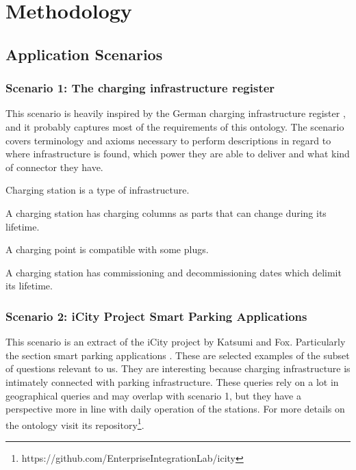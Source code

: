﻿\section{Methodology}
\label{methodology}

\subsection{Application Scenarios}

\subsubsection*{Scenario 1: The charging infrastructure register}

This scenario is heavily inspired by the German charging infrastructure
register \cite{Bundesnetzagentur.27Oct2023}, and it probably captures most of
the requirements of this ontology. The scenario covers terminology and axioms
necessary to perform descriptions in regard to where infrastructure is found,
which power they are able to deliver and what kind of connector they have.

\begin{namedbreak}
    Charging station is a type of infrastructure.
\end{namedbreak}

\begin{namedbreak}
    A charging station has charging columns as parts that can change during its lifetime.
\end{namedbreak}
\begin{namedbreak}
    A charging point is compatible with some plugs.
\end{namedbreak}

\begin{namedbreak}
    A charging station has commissioning and decommissioning dates which delimit its lifetime.
\end{namedbreak}

\subsubsection*{Scenario 2: iCity Project Smart Parking Applications}

This scenario is an extract of the iCity project by Katsumi and Fox.
Particularly the section smart parking applications \cite{Katsumi.2020}. These
are selected examples of the subset of questions relevant to us. They are
interesting because charging infrastructure is intimately connected with
parking infrastructure. These queries rely on a lot in geographical queries and
may overlap with scenario 1, but they have a perspective more in line with
daily operation of the stations. For more details on the ontology visit its
repository\footnote{https://github.com/EnterpriseIntegrationLab/icity}.


